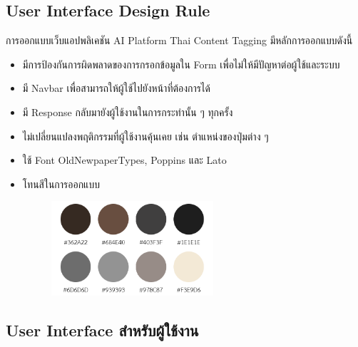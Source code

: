 \documentclass[12pt,oneside,openright,a4paper]{cpe-thai-project}
\begin{document}
\subsection{User Interface Design Rule}
การออกแบบเว็บแอปพลิเคชัน AI Platform Thai Content Tagging มีหลักการออกแบบดังนี้
\begin{itemize}
  \item มีการป้องกันการผิดพลาดของการกรอกข้อมูลใน Form เพื่อไม่ให้มีปัญหาต่อผู้ใช้และระบบ
  \item มี Navbar เพื่อสามารถให้ผู้ใช้ไปยังหน้าที่ต้องการได้
  \item มี Response กลับมายังผู้ใช้งานในการกระทำนั้น ๆ ทุกครั้ง
  \item ไม่เปลี่ยนแปลงพฤติกรรมที่ผู้ใช้งานคุ้นเคย เช่น ตำแหน่งของปุ่มต่าง ๆ
  \item ใช้ Font OldNewpaperTypes, Poppins และ Lato
  \item โทนสีในการออกแบบ 
        \begin{figure}[!ht]\centering
          \includegraphics[height=3.5cm]{./img/color.png} 
        \end{figure}
\end{itemize}

\newpage
\subsection{User Interface สำหรับผู้ใช้งาน}
\end{document}
